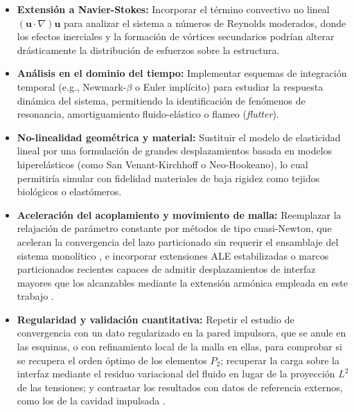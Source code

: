 \documentclass[12pt, letterpaper]{report}
\theoremstyle{definition}
\begin{document}
\begin{itemize}
    \item \textbf{Extensión a Navier-Stokes:} Incorporar el término convectivo no lineal $(\mathbf{u} \cdot \nabla)\mathbf{u}$ para analizar el sistema a números de Reynolds moderados, donde los efectos inerciales y la formación de vórtices secundarios podrían alterar drásticamente la distribución de esfuerzos sobre la estructura.
    
    \item \textbf{Análisis en el dominio del tiempo:} Implementar esquemas de integración temporal (e.g., Newmark-$\beta$ o Euler implícito) para estudiar la respuesta dinámica del sistema, permitiendo la identificación de fenómenos de resonancia, amortiguamiento fluido-elástico o flameo (\textit{flutter}).
    
    \item \textbf{No-linealidad geométrica y material:} Sustituir el modelo de elasticidad lineal por una formulación de grandes desplazamientos basada en modelos hiperelásticos (como San Venant-Kirchhoff o Neo-Hookeano), lo cual permitiría simular con fidelidad materiales de baja rigidez como tejidos biológicos o elastómeros.
    
    \item \textbf{Aceleración del acoplamiento y movimiento de malla:} Reemplazar la relajación de parámetro constante por métodos de tipo cuasi-Newton, que aceleran la convergencia del lazo particionado sin requerir el ensamblaje del sistema monolítico \cite{delaisse2023quasinewton}, e incorporar extensiones ALE estabilizadas o marcos particionados recientes capaces de admitir desplazamientos de interfaz mayores que los alcanzables mediante la extensión armónica empleada en este trabajo \cite{gao2025stabilized, zhang2024efficient}.

    \item \textbf{Regularidad y validación cuantitativa:} Repetir el estudio de convergencia con un dato regularizado en la pared impulsora, que se anule en las esquinas, o con refinamiento local de la malla en ellas, para comprobar si se recupera el orden óptimo de los elementos $P_2$; recuperar la carga sobre la interfaz mediante el residuo variacional del fluido en lugar de la proyección $L^2$ de las tensiones; y contrastar los resultados con datos de referencia externos, como los de la cavidad impulsada \cite{ghia1982high}.
\end{itemize}

\printbibliography[heading=bibintoc]
\end{document}
